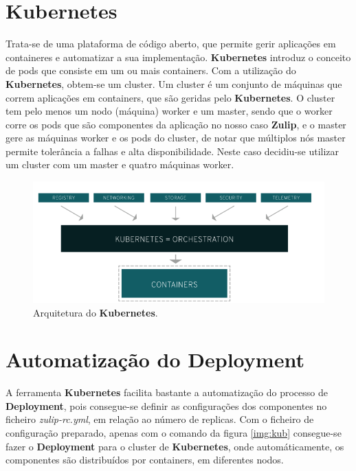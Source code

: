 \section{Kubernetes}
Trata-se de uma plataforma de código aberto, que permite gerir aplicações em containeres e automatizar a sua implementação.
\textbf{Kubernetes} introduz o conceito de \textsf{pods} que consiste em um ou mais containers.
Com a utilização do \textbf{Kubernetes}, obtem-se um \textsf{cluster}. Um cluster é um conjunto de máquinas que correm aplicações em containers, que são geridas pelo \textbf{Kubernetes}. O cluster tem pelo menos um nodo (máquina) \textsf{worker} e um \textsf{master}, sendo que o \textsf{worker} corre os \textsf{pods} que são componentes da aplicação no nosso caso \textbf{Zulip}, e o \textsf{master} gere as máquinas \textsf{worker} e os \textsf{pods} do cluster, de notar que múltiplos nós \textsf{master} permite tolerância a falhas e alta disponibilidade.
Neste caso  decidiu-se utilizar um cluster com um \textsf{master} e quatro máquinas \textsf{worker}.

\begin{figure}[h!]
\includegraphics[scale=0.90]{images/kuber.PNG}
\caption{Arquitetura do \textbf{Kubernetes}.}
\centering
\end{figure}

\section{Automatização do Deployment}

A ferramenta \textbf{Kubernetes} facilita bastante a automatização do processo de \textbf{Deployment}, pois consegue-se definir as configurações dos componentes no ficheiro \emph{zulip-rc.yml}, em relação ao número de replicas. Com o ficheiro de configuração preparado, apenas com o comando da figura \ref{img:kub} consegue-se fazer o \textbf{Deployment} para o cluster de \textbf{Kubernetes}, onde automáticamente, os componentes são distribuídos por containers, em diferentes nodos.

